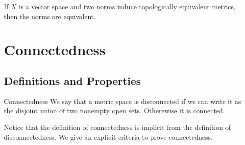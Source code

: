 \documentclass[a4paper]{article}
\begin{document}
\begin{lmm}{}{} If $X$ is a vector space and two norms induce topologically equivalent metrics, then the norms are equivalent. 
\end{lmm}

\pagebreak
\section{Connectedness}
\subsection{Definitions and Properties}
\begin{defn}{Connectedness}{} We say that a metric space is disconnected if we can write it as the disjoint union of two nonempty open sets. Otherewise it is connected. 
\end{defn}

Notice that the definition of connectedness is implicit from the definition of disconnectedness. We give an explicit criteria to prove connectedness. 
\end{document}

